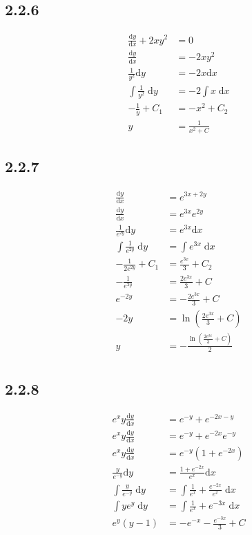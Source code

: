 \documentclass{article}
\begin{document}
\subsection{2.2.6}
\begin{align*}
    \frac{\mathrm{d}y}{\mathrm{d}x}+2xy^2 &= 0 \\
    \frac{\mathrm{d}y}{\mathrm{d}x} &= -2xy^2 \\
    \frac{1}{y^2}\mathrm{d}y &= -2x\mathrm{d}x \\
    \int \frac{1}{y^2} \; \mathrm{d}y &=-2 \int x \; \mathrm{d}x \\
    -\frac{1}{y}+C_1 &= -x^2+C_2 \\
    y  &=  \frac{1}{x^2+C}
\end{align*}

\newpage
\subsection{2.2.7}
\begin{align*}
    \frac{\mathrm{d}y}{\mathrm{d}x} &= e^{3x+2y} \\
    \frac{\mathrm{d}y}{\mathrm{d}x} &= e^{3x}e^{2y}\\
    \frac{1}{e^{2y}}\mathrm{d}y &= e^{3x}\mathrm{d}x\\
    \int \frac{1}{e^{2y}} \; \mathrm{d}y &= \int e^{3x} \; \mathrm{d}x \\
     -\frac{1}{2e^{2y}}+C_1 &= \frac{e^{3x}}{3}+C_2 \\
    -\frac{1}{e^{2y}} &= \frac{2e^{3x}}{3}+C \\
    e^{-2y} &= - \frac{2e^{3x}}{3}+C \\
    -2y &= \ln (\frac{2e^{3x}}{3}+C) \\
    y &= -\frac{\ln (\frac{2e^{3x}}{3}+C)}{2}\\
\end{align*}

\subsection{2.2.8}
\begin{align*}
    e^{x}y\frac{\mathrm{d}y}{\mathrm{d}x} &= e^{-y}+e^{-2x-y} \\
    e^{x}y\frac{\mathrm{d}y}{\mathrm{d}x} &= e^{-y}+e^{-2x}e^{-y}\\
    e^{x}y\frac{\mathrm{d}y}{\mathrm{d}x} &= e^{-y}\left(1+e^{-2x}\right)\\
    \frac{y}{e^{-y}}\mathrm{d}y &= \frac{1+e^{-2x}}{e^{x}}\mathrm{d}x \\
    \int \frac{y}{e^{-y}} \; \mathrm{d}y &= \int \frac{1}{e^{x}}+\frac{e^{-2x}}{e^{x}} \; \mathrm{d}x  \\
    \int ye^{y} \;\mathrm{d}y &= \int \frac{1}{e^{x}}+e^{-3x}\; \mathrm{d}x  \\
    e^{y}(y-1) &= -e^{-x}-\frac{e^{-3x}}{3}+C
\end{align*}
\end{document}
